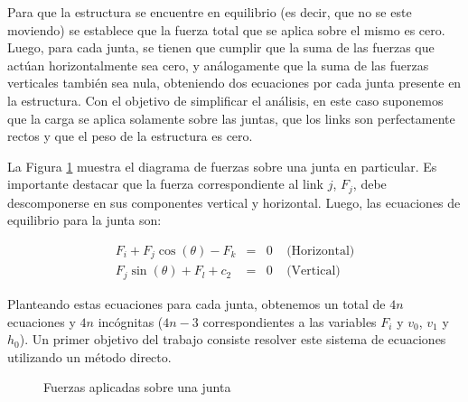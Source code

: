 Para que la estructura se encuentre en equilibrio (es decir, que no se este moviendo) se establece que la fuerza total
que se aplica sobre el mismo es cero.  Luego, para
cada junta, se tienen que cumplir que la suma de las fuerzas que act\'uan horizontalmente sea cero, y an\'alogamente que
la suma de las fuerzas verticales tambi\'en sea nula, obteniendo dos ecuaciones por cada junta presente en la
estructura. Con el objetivo de simplificar el an\'alisis, en este caso suponemos que la carga se aplica 
solamente sobre las juntas, que los links son perfectamente rectos y que el peso de la estructura es cero.

La Figura \ref{fig:jointforce} muestra el diagrama de fuerzas sobre una junta en particular. Es importante destacar que
la fuerza correspondiente al link $j$, $F_j$, debe descomponerse en sus componentes vertical y horizontal. Luego, las
ecuaciones de equilibrio para la junta son:

\begin{eqnarray}
F_i + F_j \cos(\theta) - F_k & = & 0 ~~~~~ \textrm{(Horizontal)} \\
F_j \sin(\theta) + F_l + c_2 & = & 0 ~~~~~ \textrm{(Vertical)}
\end{eqnarray}

Planteando estas ecuaciones para cada junta, obtenemos un total de $4n$ ecuaciones y $4n$ inc\'ognitas ($4n-3$
correspondientes a las variables $F_i$ y $v_0$, $v_1$ y $h_0$). Un primer objetivo del trabajo consiste resolver este
sistema de ecuaciones utilizando un m\'etodo directo.

\begin{figure}[!ht]
\begin{center}
\caption{Fuerzas aplicadas sobre una junta}
\label{fig:jointforce}
\end{center}
\end{figure}

